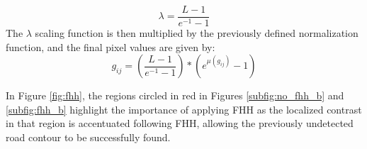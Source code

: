 \documentclass[conference]{IEEEtran}
\begin{document}
\begin{equation}
\label{eq:lambdaFHH}
    \lambda = \frac{L-1}{e^{-1}-1}
\end{equation}
The $\lambda$ scaling function is then multiplied by the previously defined normalization function, and the final pixel values are given by:
\begin{equation}
    \label{eq:finalFHH}
    g_{ij} = \left( \frac{L-1}{e^{-1}-1} \right)*(e^{\mu(g_{ij})}-1)
\end{equation}

In Figure \ref{fig:fhh}, the regions circled in red in Figures \ref{subfig:no_fhh_b} and \ref{subfig:fhh_b} highlight the importance of applying FHH as the localized contrast in that region is accentuated following FHH, allowing the previously undetected road contour to be successfully found. 
\end{document}
